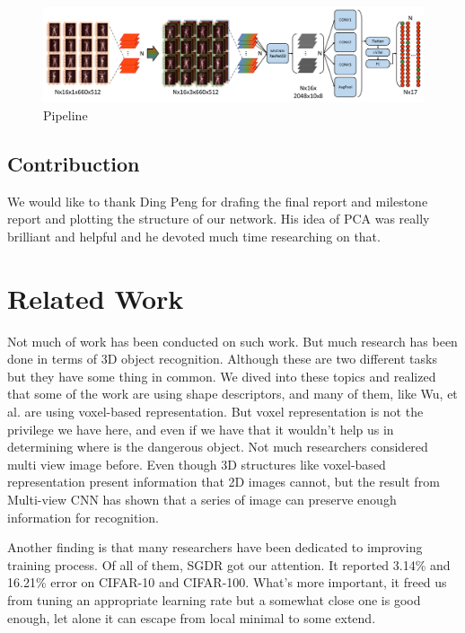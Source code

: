 \documentclass[conference,compsoc]{IEEEtran}
\begin{document}
\begin{figure}[!t]
\includegraphics[width=\textwidth]{../Pic/Network.pdf}
\caption{Pipeline}
\label{network}
\end{figure}
\subsection{Contribuction}
\par We would like to thank Ding Peng for drafing the final report and milestone report and plotting the structure of our network. His idea of PCA was really brilliant and helpful and he devoted much time researching on that.
\section{Related Work}
\par Not much of work has been conducted on such work. But much research has been done in terms of 3D object recognition. 
Although these are two different tasks but they have some thing in common. 
We dived into these topics and realized that some of the work are using shape descriptors, and many of them, like Wu, et al. \cite{wu20153d} are using voxel-based representation. But voxel representation is not the privilege we have here, and even if we have that it wouldn't help us in determining where is the dangerous object. 
Not much researchers considered multi view image before. Even though 3D structures like voxel-based representation present information that 2D images cannot, but the result from Multi-view CNN\cite{su15mvcnn}\cite{qi2016volumetric} has shown that a series of image can preserve enough information for recognition. 
\par Another finding is that many researchers have been dedicated to improving training process. Of all of them, SGDR got our attention. It reported 3.14\% and 16.21\% error on CIFAR-10 and CIFAR-100. What's more important, it freed us from tuning an appropriate learning rate but a somewhat close one is good enough, let alone it can escape from local minimal to some extend.
\end{document}

